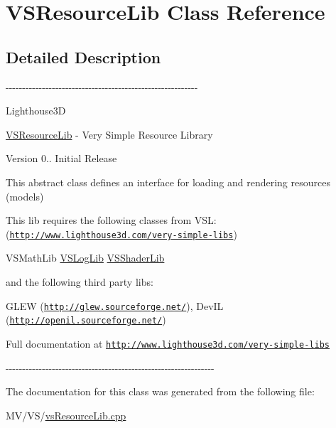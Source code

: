 \hypertarget{class_v_s_resource_lib}{\section{\-V\-S\-Resource\-Lib \-Class \-Reference}
\label{class_v_s_resource_lib}
}


\subsection{\-Detailed \-Description}
-\/-\/-\/-\/-\/-\/-\/-\/-\/-\/-\/-\/-\/-\/-\/-\/-\/-\/-\/-\/-\/-\/-\/-\/-\/-\/-\/-\/-\/-\/-\/-\/-\/-\/-\/-\/-\/-\/-\/-\/-\/-\/-\/-\/-\/-\/-\/-\/-\/-\/-\/-\/-\/-\/-\/-\/-\/-\/

\-Lighthouse3\-D

\hyperlink{class_v_s_resource_lib}{\-V\-S\-Resource\-Lib} -\/ \-Very \-Simple \-Resource \-Library

\begin{DoxyVersion}{\-Version}
0.. \-Initial \-Release
\end{DoxyVersion}
\-This abstract class defines an interface for loading and rendering resources (models)

\-This lib requires the following classes from \-V\-S\-L\-: (\href{http://www.lighthouse3d.com/very-simple-libs}{\tt http\-://www.\-lighthouse3d.\-com/very-\/simple-\/libs})

\-V\-S\-Math\-Lib \hyperlink{class_v_s_log_lib}{\-V\-S\-Log\-Lib} \hyperlink{class_v_s_shader_lib}{\-V\-S\-Shader\-Lib}

and the following third party libs\-:

\-G\-L\-E\-W (\href{http://glew.sourceforge.net/}{\tt http\-://glew.\-sourceforge.\-net/}), \-Dev\-I\-L (\href{http://openil.sourceforge.net/}{\tt http\-://openil.\-sourceforge.\-net/})

\-Full documentation at \href{http://www.lighthouse3d.com/very-simple-libs}{\tt http\-://www.\-lighthouse3d.\-com/very-\/simple-\/libs}

-\/-\/-\/-\/-\/-\/-\/-\/-\/-\/-\/-\/-\/-\/-\/-\/-\/-\/-\/-\/-\/-\/-\/-\/-\/-\/-\/-\/-\/-\/-\/-\/-\/-\/-\/-\/-\/-\/-\/-\/-\/-\/-\/-\/-\/-\/-\/-\/-\/-\/-\/-\/-\/-\/-\/-\/-\/-\/-\/-\/-\/-\/-\/ 

\-The documentation for this class was generated from the following file\-:\begin{DoxyCompactItemize}
\item 
\-M\-V/\-V\-S/\hyperlink{vs_resource_lib_8cpp}{vs\-Resource\-Lib.\-cpp}\end{DoxyCompactItemize}
